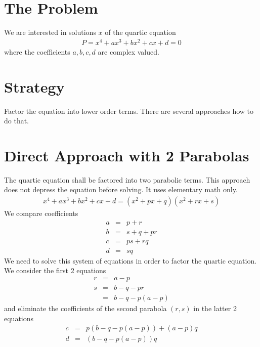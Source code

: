 \documentclass[12pt,a4paper,twoside,openright,BCOR10mm,headsepline,titlepage,abstracton,chapterprefix,final]{scrreprt}
\begin{document}
\section{The Problem}
We are interested in solutions $x$ of the quartic equation
\begin{eqnarray}
 P = x^4 + a x^3 + b x^2 + c x + d = 0
\end{eqnarray}
where the coefficients $a,b,c,d$ are complex valued.

\section{Strategy}
Factor the equation into lower order terms.
There are several approaches how to do that.

\section{Direct Approach with 2 Parabolas}
The quartic equation shall be factored into two parabolic terms.
This approach does not depress the equation before solving.
It uses elementary math only.
\begin{eqnarray}
 x^4 + a x^3 + b x^2 + c x + d = ( x^2 + p x + q )( x^2 + rx + s) 
\end{eqnarray}
We compare coefficients
\begin{subequations}
  \begin{eqnarray}
    a &=& p + r
    \\
    b &=& s + q + pr
    \\
    c &=& ps + rq
    \\
    d &=& sq
  \end{eqnarray}
\end{subequations}
We need to solve this system of equations in order to factor the quartic equation. We consider the first 2 equations
\begin{subequations}
  \begin{eqnarray}
    r &=& a - p \\
    s &=& b - q - pr \\
      &=& b - q - p (a- p)
  \end{eqnarray}
\end{subequations}
and eliminate the coefficients of the second parabola $(r,s)$ in the latter 2 equations
\begin{subequations}
  \begin{eqnarray}
    c &=& p(b - q - p (a- p)) + (a-p)q
    \\
    d &=& (b - q - p (a- p))q
  \end{eqnarray}
\end{subequations}
\end{document}
